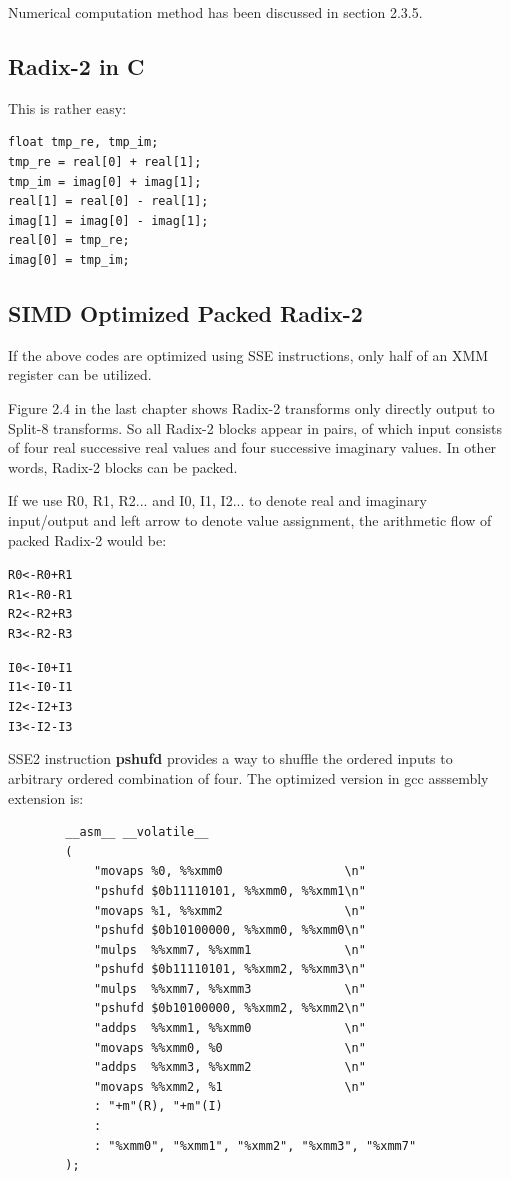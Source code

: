 \documentclass[a4paper]{report}
\begin{document}
	Numerical computation method has been discussed in section 2.3.5.

\subsection{Radix-2 in C} \indent

	This is rather easy:
	
    \lstset{language = c, tabsize = 4}
    \begin{lstlisting}
float tmp_re, tmp_im;
tmp_re = real[0] + real[1];
tmp_im = imag[0] + imag[1];
real[1] = real[0] - real[1];
imag[1] = imag[0] - imag[1];
real[0] = tmp_re;
imag[0] = tmp_im;
    \end{lstlisting}

\subsection{SIMD Optimized Packed Radix-2} \indent

	If the above codes are optimized using SSE instructions, only half of an XMM register can be utilized.
	
	Figure 2.4 in the last chapter shows Radix-2 transforms only directly output to Split-8 transforms. So all Radix-2 blocks appear in pairs, of which input consists of four real successive real values and four successive imaginary values. In other words, Radix-2 blocks can be packed.

	If we use R0, R1, R2... and I0, I1, I2... to denote real and imaginary input/output and left arrow to denote value assignment, the arithmetic flow of packed Radix-2 would be:

\begin{alltt}
\centering
R0 <- R0 + R1
R1 <- R0 - R1
R2 <- R2 + R3
R3 <- R2 - R3

I0 <- I0 + I1
I1 <- I0 - I1
I2 <- I2 + I3
I3 <- I2 - I3
\end{alltt}

	SSE2 instruction \textbf{pshufd} provides a way to shuffle the ordered inputs to arbitrary ordered combination of four. The optimized version in gcc asssembly extension is:

    \lstset{language = c, tabsize = 4}
    \begin{lstlisting}
        __asm__ __volatile__
        (
            "movaps %0, %%xmm0                 \n"
            "pshufd $0b11110101, %%xmm0, %%xmm1\n"
            "movaps %1, %%xmm2                 \n"
            "pshufd $0b10100000, %%xmm0, %%xmm0\n"
            "mulps  %%xmm7, %%xmm1             \n"
            "pshufd $0b11110101, %%xmm2, %%xmm3\n"
            "mulps  %%xmm7, %%xmm3             \n"
            "pshufd $0b10100000, %%xmm2, %%xmm2\n"
            "addps  %%xmm1, %%xmm0             \n"
            "movaps %%xmm0, %0                 \n"
            "addps  %%xmm3, %%xmm2             \n"
            "movaps %%xmm2, %1                 \n"
            : "+m"(R), "+m"(I)
            :
            : "%xmm0", "%xmm1", "%xmm2", "%xmm3", "%xmm7"
        );
    \end{lstlisting}
    
\end{document}
